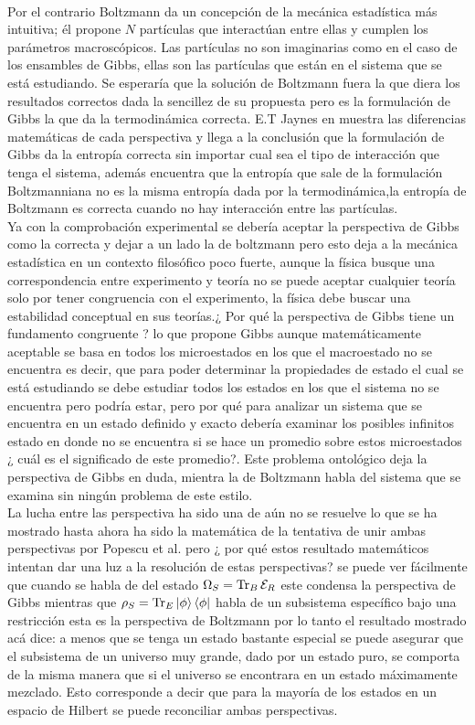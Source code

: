 \\
Por el contrario Boltzmann da un concepción de la mecánica estadística más intuitiva; él propone $N$ partículas que interactúan entre ellas y cumplen los parámetros macroscópicos. Las partículas no son imaginarias como en el caso de los ensambles de Gibbs, ellas son las partículas que están en el sistema que se está estudiando. Se esperaría que la solución de Boltzmann fuera la que diera los resultados correctos dada la sencillez de su propuesta pero es la formulación de Gibbs la que da la termodinámica correcta. E.T Jaynes en \cite{JaynesEntropies} muestra las diferencias matemáticas de cada perspectiva y llega a la conclusión que la formulación de Gibbs da la entropía correcta sin importar cual sea el tipo de interacción que tenga el sistema, además encuentra que la entropía que sale de la formulación Boltzmanniana no es la misma entropía dada por la termodinámica,la entropía de Boltzmann es correcta cuando no hay interacción entre las partículas.
\\
Ya con la comprobación experimental se debería aceptar la perspectiva de Gibbs como la correcta y dejar a un lado la de boltzmann pero esto deja a la mecánica estadística en un contexto filosófico poco fuerte, aunque la física busque una correspondencia entre experimento y teoría no se puede aceptar cualquier teoría solo por tener congruencia con el experimento, la física debe buscar una estabilidad conceptual en sus teorías.¿ Por qué la perspectiva de Gibbs tiene un fundamento congruente ?  lo que propone Gibbs aunque matemáticamente aceptable se basa en todos los microestados en los que el macroestado no se encuentra es decir, que para poder determinar la propiedades de estado el cual se está estudiando se debe estudiar todos los estados en los que el sistema no se encuentra pero podría estar, pero por qué para analizar un sistema que se encuentra en un estado definido y exacto debería examinar los posibles infinitos estado en donde no se encuentra si se hace un promedio sobre estos microestados ¿ cuál es el significado de este promedio?. Este problema ontológico deja la perspectiva de Gibbs en duda, mientra la de Boltzmann habla del sistema que se examina sin ningún problema de este estilo. 
\\
La lucha entre las perspectiva ha sido una de aún no se resuelve lo que se ha mostrado hasta ahora ha sido la matemática de la tentativa de unir ambas perspectivas por Popescu et al. pero ¿ por qué estos resultado matemáticos intentan dar una luz a la resolución de estas perspectivas? se puede ver fácilmente que cuando se habla de del estado $ \Omega_{S} = \Tr_{B} \mathcal{E}_{R} $  este condensa la perspectiva de Gibbs mientras que $\rho_{S} = \Tr_{E} \ket{\phi} \bra{\phi}$ habla de un subsistema específico bajo una restricción esta es la perspectiva de Boltzmann por lo tanto el resultado mostrado acá dice: a menos que se tenga un estado bastante especial se puede asegurar que el subsistema de un universo muy grande, dado por un estado puro, se comporta de la misma manera que si el universo se encontrara en un estado máximamente mezclado. Esto corresponde a decir que para la mayoría de los estados en un espacio de Hilbert se puede reconciliar ambas perspectivas.
